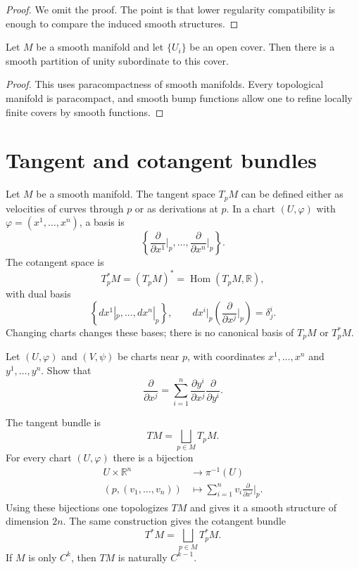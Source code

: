 \begin{proof}
We omit the proof.  The point is that lower
regularity compatibility is enough to compare
the induced smooth structures.
\end{proof}

\begin{theorem}
\label{theorem-partition-of-unity}
Let $M$ be a smooth manifold and let
$\{U_i\}$ be an open cover.  Then there is a
smooth partition of unity subordinate to this
cover.
\end{theorem}

\begin{proof}
This uses paracompactness of smooth
manifolds.  Every topological manifold is
paracompact, and smooth bump functions allow
one to refine locally finite covers by smooth
functions.
\end{proof}

\section{Tangent and cotangent bundles}
\label{section-tangent-cotangent-bundles}

\noindent
Let $M$ be a smooth manifold.  The tangent
space $T_pM$ can be defined either as
velocities of curves through $p$ or as
derivations at $p$.  In a chart
$(U,\varphi)$ with
$\varphi=(x^1,\ldots,x^n)$, a basis is
$$
\left\{
\frac{\partial}{\partial x^1}\Big|_p,
\ldots,
\frac{\partial}{\partial x^n}\Big|_p
\right\}.
$$
The cotangent space is
$$
T_p^*M=(T_pM)^*
=\operatorname{Hom}(T_pM,\mathbb R),
$$
with dual basis
$$
\left\{dx^1|_p,\ldots,dx^n|_p\right\},
\qquad
 dx^i|_p
\left(
\frac{\partial}{\partial x^j}\Big|_p
\right)=\delta^i_j.
$$
Changing charts changes these bases; there is
no canonical basis of $T_pM$ or $T_p^*M$.

\begin{exercise}
\label{exercise-change-of-basis}
Let $(U,\varphi)$ and $(V,\psi)$ be charts
near $p$, with coordinates
$x^1,\ldots,x^n$ and $y^1,\ldots,y^n$.
Show that
$$
\frac{\partial}{\partial x^j}
=
\sum_{i=1}^n
\frac{\partial y^i}{\partial x^j}
\frac{\partial}{\partial y^i}.
$$
\end{exercise}

\noindent
The tangent bundle is
$$
TM=\bigsqcup_{p\in M}T_pM.
$$
For every chart $(U,\varphi)$ there is a
bijection
$$
\begin{aligned}
U\times \mathbb R^n
&\longrightarrow \pi^{-1}(U)\\
(p,(v_1,\ldots,v_n))
&\longmapsto
\sum_{i=1}^n v_i
\frac{\partial}{\partial x^i}\Big|_p.
\end{aligned}
$$
Using these bijections one topologizes $TM$
and gives it a smooth structure of dimension
$2n$.  The same construction gives the
cotangent bundle
$$
T^*M=\bigsqcup_{p\in M}T_p^*M.
$$
If $M$ is only $C^k$, then $TM$ is naturally
$C^{k-1}$.

